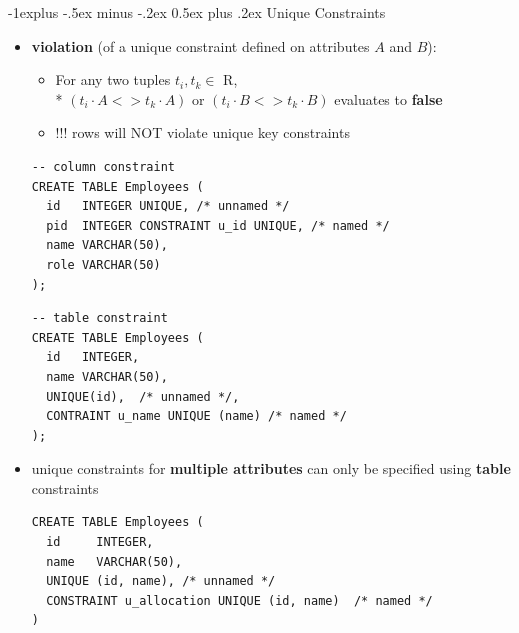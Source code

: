 \documentclass[10pt, landscape]{article}
\makeatletter
\renewcommand{\subsection}{\@startsection{subsection}{2}{0mm}%
  {-1explus -.5ex minus -.2ex}%
  {0.5ex plus .2ex}%
{\normalfont\normalsize\bfseries}}
\makeatother
\begin{document}
\begin{multicols}{3}
  \subsection{Unique Constraints}
  \begin{itemize}
    \item \textbf{violation} (of a unique constraint defined on attributes $A$ and $B$):
      \begin{itemize}
        \item For any two tuples $t_i, t_k \in$ R, \\*
          $(t_i\cdot A <> t_k\cdot A)$ or  $(t_i\cdot B <> t_k \cdot B)$ evaluates to  \textbf{false}
        \item  !!!  rows will NOT violate unique key constraints
      \end{itemize}
      \begin{lstlisting}[style=mySQL]
-- column constraint
CREATE TABLE Employees (
  id   INTEGER UNIQUE, /* unnamed */
  pid  INTEGER CONSTRAINT u_id UNIQUE, /* named */
  name VARCHAR(50), 
  role VARCHAR(50)
);
      \end{lstlisting}
      \begin{lstlisting}[style=mySQL]
-- table constraint
CREATE TABLE Employees (
  id   INTEGER,
  name VARCHAR(50), 
  UNIQUE(id),  /* unnamed */,
  CONTRAINT u_name UNIQUE (name) /* named */
);
      \end{lstlisting}
    \item unique constraints for \textbf{multiple attributes} can only be specified using \textbf{table} constraints
      \begin{lstlisting}[style=mySQL]
CREATE TABLE Employees (
  id     INTEGER,
  name   VARCHAR(50),
  UNIQUE (id, name), /* unnamed */
  CONSTRAINT u_allocation UNIQUE (id, name)  /* named */
)
      \end{lstlisting}
  \end{itemize}


\end{multicols}
\end{document}
